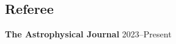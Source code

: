\documentclass[margin,line,11pt]{resume}
\begin{document}
\begin{resume}
\section{\mysidestyle Referee}
\textbf{The Astrophysical Journal} \hfill 2023--Present

\end{resume}   
\end{document}
